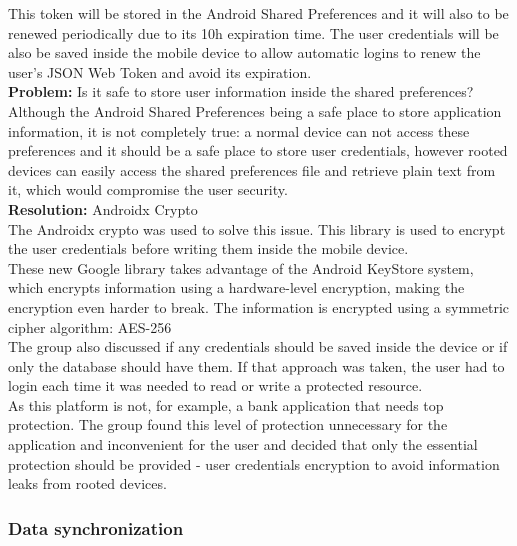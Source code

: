 This token will be stored in the Android Shared Preferences and it will also to be renewed periodically due to its 10h expiration time. The user credentials will be also be saved
inside the mobile device to allow automatic logins to renew the user's JSON Web Token and avoid its expiration.\\

\textbf{Problem:} Is it safe to store user information inside the shared preferences?\\

Although the Android Shared Preferences being a safe place to store application information, it is not completely true:
a normal device can not access these preferences and it should be a safe place to store user credentials, however rooted devices can easily
access the shared preferences file and retrieve plain text from it, which would compromise the user security.\\

\textbf{Resolution:} Androidx Crypto\\

The Androidx crypto was used to solve this issue. This library is used to encrypt the user credentials before writing them inside the mobile device.\\

These new Google library takes advantage of the Android KeyStore system, which encrypts information using a hardware-level encryption, making the
encryption even harder to break. The information is encrypted using a symmetric cipher algorithm: AES-256\\

The group also discussed if any credentials should be saved inside the device or if only the database should have them.
If that approach was taken, the user had to login each time it was needed to read or write a protected resource.\\

As this platform is not, for example, a bank application that needs top protection. The group found this level of protection
unnecessary for the application and inconvenient for the user and decided that only the essential protection should be provided - 
user credentials encryption to avoid information leaks from rooted devices.

\subsubsection{Data synchronization}

